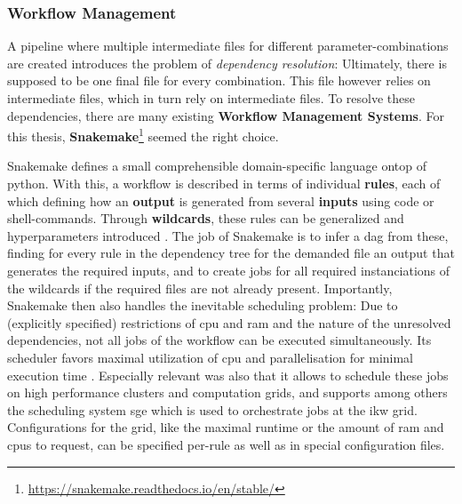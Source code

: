 \subsubsection{Workflow Management}

A pipeline where multiple intermediate files for different parameter-combinations are created introduces the problem of \emph{dependency resolution}: Ultimately, there is supposed to be one final file for every combination. This file however relies on intermediate files, which in turn rely on intermediate files. To resolve these dependencies, there are many existing \textbf{Workflow Management Systems}. For this thesis, \textbf{Snakemake}\footnote{\url{https://snakemake.readthedocs.io/en/stable/}} \cite{Molder2021a} seemed the right choice.

Snakemake defines a small comprehensible domain-specific language ontop of python. With this, a workflow is described in terms of individual \textbf{rules}, each of which defining how an \textbf{output} is generated from several \textbf{inputs} using code or shell-commands. Through \textbf{wildcards}, these rules can be generalized and hyperparameters introduced \cite{Molder2021a}. The job of Snakemake is to infer a \gls{dag} from these, finding for every rule in the dependency tree for the demanded file an output that generates the required inputs, and to create jobs for all required instanciations of the wildcards if the required files are not already present. Importantly, Snakemake then also handles the inevitable scheduling problem: Due to (explicitly specified) restrictions of \acrshort{cpu} and \acrshort{ram} and the nature of the unresolved dependencies, not all jobs of the workflow can be executed simultaneously. Its scheduler favors maximal utilization of \acrshort{cpu} and parallelisation for minimal execution time \cite{Molder2021a}. Especially relevant was also that it allows to schedule these jobs on high performance clusters and computation grids, and supports among others the scheduling system \gls{sge} which is used to orchestrate jobs at the \gls{ikw} grid. Configurations for the grid, like the maximal runtime or the amount of \gls{ram} and \glspl{cpu} to request, can be specified per-rule as well as in special configuration files.

